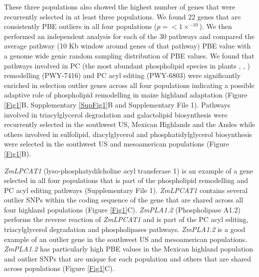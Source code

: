 \documentclass[9pt,twocolumn,twoside]{BioRxiv}
\begin{document}
These three populations also showed the highest number of genes that were recurrently selected in at least three populations.
We found 22 genes that are consistently PBE outliers in all four populations ($p =<1  \times  ^{-10}$). 
We then performed an independent analysis for each of the 30 pathways and compared the average pathway (10 Kb window around genes of that pathway) PBE value with a genome wide genic random sampling distribution of PBE values. 
We found that pathways involved in PC (the most abundant phospholipid species in plants \cite{Gu2017-nd}, \cite{Poincelot1976-qe}, \cite{Hawke1974-ab}) remodelling (PWY-7416) and PC acyl editing (PWY-6803) were significantly enriched in selection outlier genes across all four populations indicating a possible adaptive role of phospholipid remodelling in maize highland adaptation (Figure \ref{Fig1}B, Supplementary \ref{SupFig1}B and Supplementary File 1). 
Pathways involved in triacylglycerol degradation and galactolipid biosynthesis were recurrently selected in the southwest US, Mexican Highlands and the Andes while others involved in sulfolipid, diacylglycerol and phosphatidylglycerol biosynthesis were selected in the southwest US and mesoamerican populations (Figure \ref{Fig1}B).  

\textit{ZmLPCAT1} (lyso-phosphatydilcholine acyl transferase 1) is an example of a gene selected in all four populations that is part of the phospholipid remodelling and PC acyl editing pathways (Supplementary File 1).
\textit{ZmLPCAT1} contains several outlier SNPs within the coding sequence of the gene that are shared across all four highland populations (Figure \ref{Fig1}C). 
\textit{ZmPLA1.2} (Phospholipase A1.2) performs the reverse reaction of \textit{ZmLPCAT1} and is part of the PC acyl editing, triacylglycerol degradation and phospholipases pathways. 
\textit{ZmPLA1.2} is a good example of an outlier gene in the southwest US and mesoamerican populations.
\textit{ZmPLA1.2} has particularly high PBE values in the Mexican highland population and outlier SNPs that are unique for each population and others that are shared across populations (Figure \ref{Fig1}C). 
\end{document}
